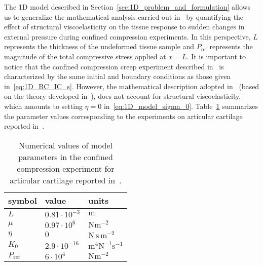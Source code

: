 \documentclass[12pt,a4paper]{amsart}
\theoremstyle{definition}
\newcommand{\unit}[1]{\mathrm{#1}}
\begin{document}
The 1D model described in Section~\ref{sec:1D_problem_and_formulation} allows us to generalize the mathematical analysis carried out in~\cite{Soltz1998} by quantifying the effect of structural viscoelasticity on the tissue response to sudden changes in external pressure during confined compression experiments.
In this perspective, $L$ represents the thickness of the undeformed tissue
sample and $P_{\text{ref}}$ represents the magnitude of the total compressive stress
applied at $x=L$. It is important to notice that the
confined compression creep experiment described in~\cite{Soltz1998} is characterized by the same initial and boundary conditions as those given in~\eqref{eq:1D_BC_IC_s}.
However, the mathematical description adopted in~\cite{Soltz1998} (based on the theory developed
in~\cite{mow}), does not account for structural viscoelasticity, which amounts to setting
$\eta=0$ in~\eqref{eq:1D_model_sigma_0}.
Table~\ref{tab:atesian_soltz} summarizes the parameter values corresponding to the experiments on articular cartilage reported in~\cite{Soltz1998}.
\begin{table}[h!]
\centering
\begin{tabular}{|l|l|l|}
\hline
\textsf{symbol} & \textsf{value} & \textsf{units} \\ \hline
$L$             & $0.81 \cdot 10^{-3}$ & $\unit{m}$ \\ \hline
$\mu$           & $0.97 \cdot 10^6$    & $\unit{N m^{-2}}$ \\ \hline
$\eta$          & $0$                  & $\unit{N \,s \,m^{-2}}$ \\ \hline
$K_0$             & $2.9 \cdot 10^{-16}$ & $\unit{m^4 N^{-1} s^{-1}}$ \\ \hline
$P_{\text{ref}}$           & $6 \cdot 10^{4}$     & $\unit{N m^{-2}}$ \\ \hline
\end{tabular}
\caption{Numerical values of model parameters in the confined compression experiment for articular cartilage
reported in~\cite{Soltz1998}.}
\label{tab:atesian_soltz}
\end{table}
\end{document}
